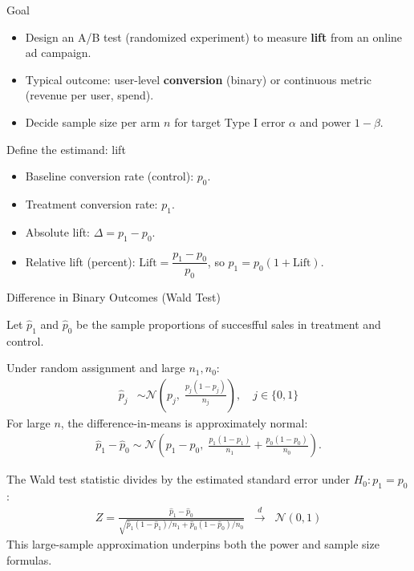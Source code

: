 \documentclass[aspectratio=169,11pt]{beamer}
\begin{document}
\begin{frame}{Goal}
  \begin{itemize}
    \item Design an A/B test (randomized experiment) to measure \textbf{lift} from an online ad campaign.
    \item Typical outcome: user-level \textbf{conversion} (binary) or continuous metric (revenue per user, spend).
    \item Decide sample size per arm $n$ for target Type I error $\alpha$ and power $1-\beta$.
  \end{itemize}
\end{frame}

\begin{frame}{Define the estimand: lift}
  \begin{itemize}
    \item Baseline conversion rate (control): $p_0$.
    \item Treatment conversion rate: $p_1$.
    \item Absolute lift: $\Delta = p_1 - p_0$.
    \item Relative lift (percent): $\text{Lift} = \dfrac{p_1 - p_0}{p_0}$, so $p_1 = p_0(1+\text{Lift})$.
  \end{itemize}
\end{frame}

\begin{frame}{Difference in Binary Outcomes (Wald Test)}

Let $\hat{p}_1$ and $\hat{p}_0$ be the sample proportions of succesfful sales in treatment and control.

Under random assignment and large $n_1, n_0$:
\begin{align*}
\hat{p}_j &\sim \mathcal{N}\!\left(p_j,\; \frac{p_j(1-p_j)}{n_j}\right), \quad j\in\{0,1\}
\end{align*}
For large $n$, the difference-in-means is approximately normal:
\begin{align*}
\hat{p}_1 - \hat{p}_0 
\sim \mathcal{N}\!\left(p_1 - p_0,\;
\frac{p_1(1-p_1)}{n_1} + \frac{p_0(1-p_0)}{n_0}\right).
\end{align*}

The Wald test statistic divides by the estimated standard error under $H_0: p_1 = p_0$:
\begin{align*}
Z = \frac{\hat{p}_1 - \hat{p}_0}
         {\sqrt{\hat{p}_1(1-\hat{p}_1)/n_1 + \hat{p}_0(1-\hat{p}_0)/n_0}}
\;\;\xrightarrow[]{d}\;\; \mathcal{N}(0,1)
\end{align*}
This large-sample approximation underpins both the \alert{power} and \alert{sample size} formulas.
\end{frame}
\end{document}
